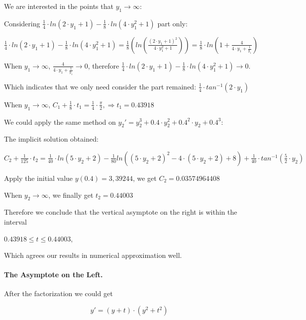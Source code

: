 \documentclass[11pt,a4paper]{article}
\begin{document}
	We are interested in the points that $y_1 \rightarrow \infty$:
	
	Considering $\frac{1}{4} \cdot ln(2 \cdot y_1 + 1)-\frac{1}{8}\cdot ln(4 \cdot y_1^2+1)$ part only:
	
	\begin{center}
		$\frac{1}{4} \cdot ln(2\cdot y_1 + 1)- \frac{1}{8}\cdot ln(4\cdot y_1^2+1) = \frac{1}{8}(ln(\frac{(2\cdot y_1+1)^2}{4\cdot y_1^2+1}))=\frac{1}{8}\cdot ln(1+\frac{4}{4\cdot y_1+\frac{1}{y_1}})$
	\end{center}
	
	When $y_1 \rightarrow \infty$, $\frac{4}{4\cdot y_1+\frac{1}{y_1}}\rightarrow 0$, therefore $\frac{1}{4} \cdot ln(2 \cdot y_1 + 1)-\frac{1}{8}\cdot ln(4\cdot y_1^2+1) \rightarrow 0$.
	
	Which indicates that we only need consider the part remained: $\frac{1}{4} \cdot tan^{-1}(2\cdot y_1)$
	
	When $y_1 \rightarrow \infty$, $C_1+ \frac{1}{8}\cdot t_1 = \frac{1}{4} \cdot \frac{\pi}{2}, \Rightarrow t_1 = 0.43918$
	
	We could apply the same method on $y_2' = y_2^3 + 0.4 \cdot y_2^2 + 0.4^2 \cdot y_2 + 0.4 ^3$:
	
	The implicit solution obtained:
	
	\begin{center}
		$C_2 + \frac{1}{125}\cdot t_2 = \frac{1}{40}\cdot ln(5\cdot y_2 + 2)- \frac{1}{80}ln((5\cdot y_2+2)^2 - 4\cdot(5\cdot y_2 + 2)+8)+ \frac{1}{40}\cdot tan^{-1}(\frac{5}{2}\cdot y_2)$
	\end{center}
	
	Apply the initial value $y(0.4)=3,39244$, we get $C_2=0.03574964408$
	
	When $y_2 \rightarrow \infty$, we finally get $t_2=0.44003$
	
	Therefore we conclude that the vertical asymptote on the right is within the interval 
	
	\begin{center}
		$0.43918 \leq t \leq 0.44003$, 
	\end{center}
	
	Which agrees our results in numerical approximation well.
	
	
	\paragraph{The Asymptote on the Left.}	After the factorization we could get
	\begin{center}
		\begin{equation}
			y'=(y+t)\cdot (y^2 + t^2) \tag{Equ 2.3.2.1} \label{Equ.2.3.2.1}
		\end{equation}
	\end{center}
\end{document}
